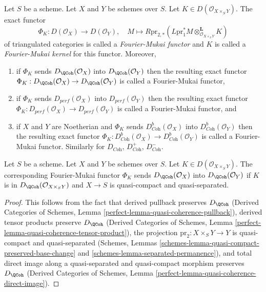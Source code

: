 \begin{definition}
\label{definition-fourier-mukai-functor}
Let $S$ be a scheme. Let $X$ and $Y$ be schemes over $S$.
Let $K \in D(\mathcal{O}_{X \times_S Y})$. The exact functor
$$
\Phi_K : D(\mathcal{O}_X) \longrightarrow D(\mathcal{O}_Y),\quad
M \longmapsto R\text{pr}_{2, *}(
L\text{pr}_1^*M \otimes_{\mathcal{O}_{X \times_S Y}}^\mathbf{L} K)
$$
of triangulated categories is called a {\it Fourier-Mukai functor}
and $K$ is called a {\it Fourier-Mukai kernel} for this functor.
Moreover,
\begin{enumerate}
\item if $\Phi_K$ sends $D_\QCoh(\mathcal{O}_X)$ into $D_\QCoh(\mathcal{O}_Y)$
then the resulting exact functor
$\Phi_K : D_\QCoh(\mathcal{O}_X) \to D_\QCoh(\mathcal{O}_Y)$
is called a Fourier-Mukai functor,
\item if $\Phi_K$ sends $D_{perf}(\mathcal{O}_X)$ into
$D_{perf}(\mathcal{O}_Y)$ then the resulting exact functor
$\Phi_K : D_{perf}(\mathcal{O}_X) \to D_{perf}(\mathcal{O}_Y)$
is called a Fourier-Mukai functor, and
\item if $X$ and $Y$ are Noetherian and $\Phi_K$ sends
$D^b_{\textit{Coh}}(\mathcal{O}_X)$ into $D^b_{\textit{Coh}}(\mathcal{O}_Y)$
then the resulting exact functor
$\Phi_K : D^b_{\textit{Coh}}(\mathcal{O}_X) \to
D^b_{\textit{Coh}}(\mathcal{O}_Y)$
is called a Fourier-Mukai functor.
Similarly for $D_{\textit{Coh}}$, $D^+_{\textit{Coh}}$, $D^-_{\textit{Coh}}$.
\end{enumerate}
\end{definition}

\begin{lemma}
\label{lemma-fourier-Mukai-QCoh}
Let $S$ be a scheme. Let $X$ and $Y$ be schemes over $S$.
Let $K \in D(\mathcal{O}_{X \times_S Y})$.
The corresponding Fourier-Mukai functor $\Phi_K$ sends
$D_\QCoh(\mathcal{O}_X)$ into $D_\QCoh(\mathcal{O}_Y)$
if $K$ is in $D_\QCoh(\mathcal{O}_{X \times_S Y})$ and $X \to S$ is
quasi-compact and quasi-separated.
\end{lemma}

\begin{proof}
This follows from the fact that derived pullback preserves
$D_\QCoh$
(Derived Categories of Schemes, Lemma
\ref{perfect-lemma-quasi-coherence-pullback}),
derived tensor products preserve $D_\QCoh$
(Derived Categories of Schemes, Lemma
\ref{perfect-lemma-quasi-coherence-tensor-product}),
the projection $\text{pr}_2 : X \times_S Y \to Y$ is
quasi-compact and quasi-separated
(Schemes, Lemmas
\ref{schemes-lemma-quasi-compact-preserved-base-change} and
\ref{schemes-lemma-separated-permanence}), and
total direct image along a quasi-separated and quasi-compact
morphism preserves $D_\QCoh$
(Derived Categories of Schemes, Lemma
\ref{perfect-lemma-quasi-coherence-direct-image}).
\end{proof}

